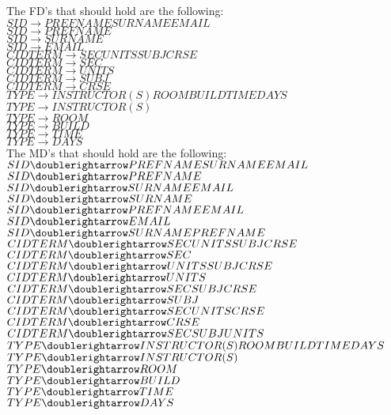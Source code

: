 
The FD's that should hold are the following:  \\

$SID \rightarrow PREFNAME SURNAME EMAIL  $ \\
$SID \rightarrow PREFNAME$ \\
$SID \rightarrow SURNAME$ \\
$SID \rightarrow EMAIL$ \\ 

$CID TERM \rightarrow SEC UNITS SUBJ CRSE$ \\
$CID TERM \rightarrow SEC$ \\
$CID TERM \rightarrow UNITS$ \\ 
$CID TERM \rightarrow SUBJ$ \\
$CID TERM \rightarrow CRSE$ \\

$TYPE \rightarrow INSTRUCTOR(S) ROOM BUILD TIME DAYS$ \\
$TYPE \rightarrow INSTRUCTOR(S)$ \\
$TYPE \rightarrow ROOM$ \\
$TYPE \rightarrow BUILD$ \\ 
$TYPE \rightarrow TIME$ \\
$TYPE \rightarrow DAYS$ \\


The MD's that should hold are the following: \\

$SID \doublerightarrow PREFNAME SURNAME EMAIL$ \\
$SID \doublerightarrow PREFNAME$ \\
$SID \doublerightarrow SURNAME EMAIL$ \\
$SID \doublerightarrow SURNAME$ \\
$SID \doublerightarrow PREFNAME EMAIL$ \\
$SID \doublerightarrow EMAIL$ \\ 
$SID \doublerightarrow SURNAME PREFNAME$ \\

$CID TERM \doublerightarrow SEC UNITS SUBJ CRSE$ \\
$CID TERM \doublerightarrow SEC$ \\
$CID TERM \doublerightarrow UNITS SUBJ CRSE$ \\
$CID TERM \doublerightarrow UNITS$ \\
$CID TERM \doublerightarrow SEC SUBJ CRSE$\\
$CID TERM \doublerightarrow SUBJ$ \\
$CID TERM \doublerightarrow SEC UNITS CRSE$ \\
$CID TERM \doublerightarrow CRSE$ \\
$CID TERM \doublerightarrow SEC SUBJ UNITS$ \\

$TYPE \doublerightarrow INSTRUCTOR(S) ROOM BUILD TIME DAYS$ \\
$TYPE \doublerightarrow INSTRUCTOR(S)$ \\
$TYPE \doublerightarrow ROOM$ \\
$TYPE \doublerightarrow BUILD$ \\
$TYPE \doublerightarrow TIME$ \\
$TYPE \doublerightarrow DAYS$ \\

